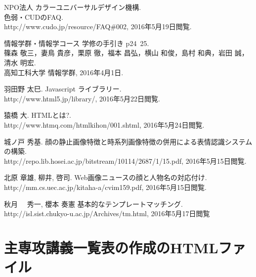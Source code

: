 \documentclass[a4j]{jarticle}
\begin{document}

\begin{thebibliography}{1}

NPO法人 カラーユニバーサルデザイン機構.\\
\newblock 色弱・CUDのFAQ.\\
\newblock http://www.cudo.jp/resource/FAQ\#002, 2016年5月19日閲覧.

情報学群・情報学コース 学修の手引き p24~25.\\
\newblock 篠森 敬三，妻鳥 貴彦，栗原 徹，福本 昌弘，横山 和俊，島村 和典，岩田 誠，清水 明宏.\\
\newblock 高知工科大学 情報学群, 2016年4月1日.

  羽田野 太巳.
  \newblock Javascript ライブラリー.\\
  \newblock http://www.html5.jp/library/, 2016年5月22日閲覧.

  猿橋 大.
  \newblock HTMLとは?.\\
  \newblock http://www.htmq.com/htmlkihon/001.shtml, 2016年5月24日閲覧.

  城ノ戸 秀基.
  \newblock 顔の静止画像特徴と時系列画像特徴の併用による表情認識システムの構築.\\
  \newblock http://repo.lib.hosei.ac.jp/bitstream/10114/2687/1/15.pdf, 2016年5月15日閲覧.

  北原 章雄, 柳井, 啓司.
  \newblock Web画像ニュースの顔と人物名の対応付け.\\
  \newblock http://mm.cs.uec.ac.jp/kitaha-a/cvim159.pdf, 2016年5月15日閲覧.

  秋月 　秀一, 櫻本 奏憲
  \newblock 基本的なテンプレートマッチング.\\
  \newblock http://isl.sist.chukyo-u.ac.jp/Archives/tm.html, 2016年5月17日閲覧
\end{thebibliography}
\newpage

\appendix

\section{主専攻講義一覧表の作成のHTMLファイル}

\end{document}

